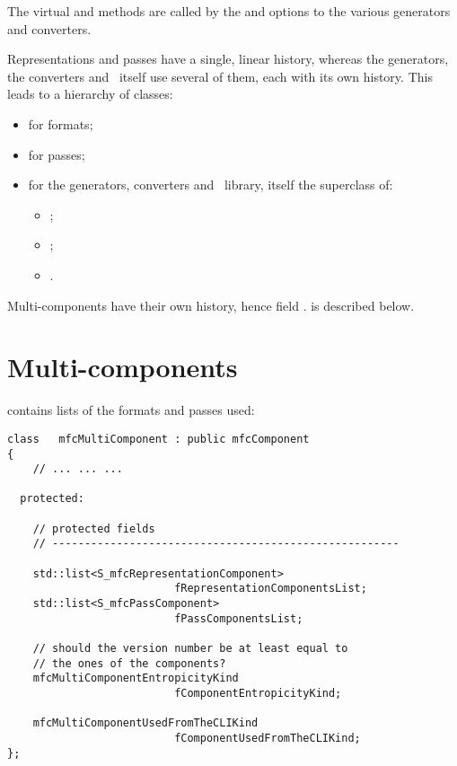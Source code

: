 The virtual  and  methods are called by the  and  options to the various generators and converters.


Representations and passes have a single, linear history, whereas the generators, the converters and \mf\ itself use several of them, each with its own history. This leads to a hierarchy of classes:
\begin{itemize}
\item {} for formats;
\item {} for passes;
\item {} for the generators, converters and \mf\ library, itself the superclass  of:


\begin{itemize}
	\item {};
	\item {};
	\item {}.
	\end{itemize}

\end{itemize}

Multi-components have their own history, hence field .
 is described below.


\section{Multi-components}\label{Multi-components}

 contains lists of the formats and passes used:
\begin{lstlisting}[language=CPlusPlus]
class   mfcMultiComponent : public mfcComponent
{
	// ... ... ...

  protected:

    // protected fields
    // ------------------------------------------------------

    std::list<S_mfcRepresentationComponent>
                          fRepresentationComponentsList;
    std::list<S_mfcPassComponent>
                          fPassComponentsList;

    // should the version number be at least equal to
    // the ones of the components?
    mfcMultiComponentEntropicityKind
                          fComponentEntropicityKind;

    mfcMultiComponentUsedFromTheCLIKind
                          fComponentUsedFromTheCLIKind;
};
\end{lstlisting}

